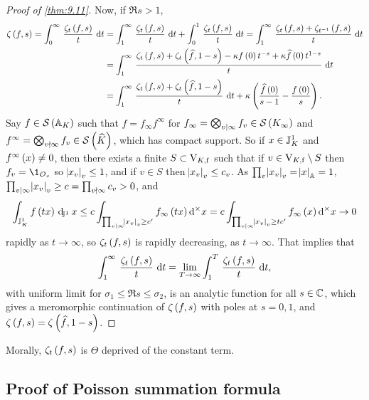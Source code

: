 \begin{proof}[Proof of \ref{thm:9.11}]
Now, if $ \Re s > 1 $,
\begin{align*}
\zeta\br{f, s}
= \intd{0}{\infty}{\dfrac{\zeta_t\br{f, s}}{t}}{t}
& = \intd{1}{\infty}{\dfrac{\zeta_t\br{f, s}}{t}}{t} + \intd{0}{1}{\dfrac{\zeta_t\br{f, s}}{t}}{t}
= \intd{1}{\infty}{\dfrac{\zeta_t\br{f, s} + \zeta_{t^{-1}}\br{f, s}}{t}}{t} \\
& = \intd{1}{\infty}{\dfrac{\zeta_t\br{f, s} + \zeta_t\br{\widehat{f}, 1 - s} - \kappa f\br{0}t^{-s} + \kappa\widehat{f}\br{0}t^{1 - s}}{t}}{t} \\
& = \intd{1}{\infty}{\dfrac{\zeta_t\br{f, s} + \zeta_t\br{\widehat{f}, 1 - s}}{t}}{t} + \kappa\br{\dfrac{\widehat{f}\br{0}}{s - 1} - \dfrac{f\br{0}}{s}}.
\end{align*}
Say $ f \in \SSS\br{\AA_K} $ such that $ f = f_\infty f^\infty $ for $ f_\infty = \bigotimes_{v \mid \infty} f_v \in \SSS\br{K_\infty} $ and $ f^\infty = \bigotimes_{v \nmid \infty} f_v \in \SSS\br{\widehat{K}} $, which has compact support. So if $ x \in \mathbb{J}_K^1 $ and $ f^\infty\br{x} \ne 0 $, then there exists a finite $ S \subset \mathrm{V}_{K, \mathrm{f}} $ such that if $ v \in \mathrm{V}_{K, \mathrm{f}} \setminus S $ then $ f_v = \1_{\OOO_v} $ so $ \abs{x_v}_v \le 1 $, and if $ v \in S $ then $ \abs{x_v}_v \le c_v $. As $ \prod_v \abs{x_v}_v = \abs{x}_{\mathbb{A}} = 1 $, $ \prod_{v \mid \infty} \abs{x_v}_v \ge c = \prod_{v \nmid \infty} c_v > 0 $, and
$$ \intJI{f\br{tx}}{x} \le c\int_{\prod_{v \mid \infty} \abs{x_v}_v \ge c'} f_\infty\br{tx} \d^\times x = c\int_{\prod_{v \mid \infty} \abs{x_v}_v \ge tc'} f_\infty\br{x} \d^\times x \to 0 $$
rapidly as $ t \to \infty $, so $ \zeta_t\br{f, s} $ is rapidly decreasing, as $ t \to \infty $. That implies that
$$ \intd{1}{\infty}{\dfrac{\zeta_t\br{f, s}}{t}}{t} = \lim_{T \to \infty} \intd{1}{T}{\dfrac{\zeta_t\br{f, s}}{t}}{t}, $$
with uniform limit for $ \sigma_1 \le \Re s \le \sigma_2 $, is an analytic function for all $ s \in \mathbb{C} $, which gives a meromorphic continuation of $ \zeta\br{f, s} $ with poles at $ s = 0, 1 $, and $ \zeta\br{f, s} = \zeta\br{\widehat{f}, 1 - s} $.
\end{proof}

Morally, $ \zeta_t\br{f, s} $ is $ \Theta $ deprived of the constant term.

\pagebreak

\subsection{Proof of Poisson summation formula}

